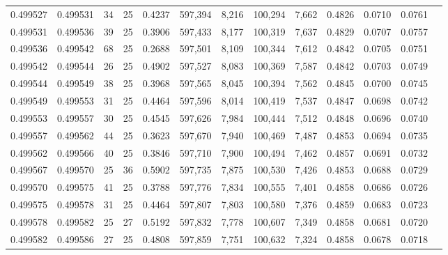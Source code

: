\begin{tabular}{rrrrrrrrrrrrr}
0.499527 & 0.499531 &    34 &  25 &                                     0.4237 & 597,394 &   8,216 & 100,294 &   7,662 & 0.4826 & 0.0710 & 0.0761 \\
0.499531 & 0.499536 &    39 &  25 &                                     0.3906 & 597,433 &   8,177 & 100,319 &   7,637 & 0.4829 & 0.0707 & 0.0757 \\
0.499536 & 0.499542 &    68 &  25 &                                     0.2688 & 597,501 &   8,109 & 100,344 &   7,612 & 0.4842 & 0.0705 & 0.0751 \\
0.499542 & 0.499544 &    26 &  25 &                                     0.4902 & 597,527 &   8,083 & 100,369 &   7,587 & 0.4842 & 0.0703 & 0.0749 \\
0.499544 & 0.499549 &    38 &  25 &                                     0.3968 & 597,565 &   8,045 & 100,394 &   7,562 & 0.4845 & 0.0700 & 0.0745 \\
0.499549 & 0.499553 &    31 &  25 &                                     0.4464 & 597,596 &   8,014 & 100,419 &   7,537 & 0.4847 & 0.0698 & 0.0742 \\
0.499553 & 0.499557 &    30 &  25 &                                     0.4545 & 597,626 &   7,984 & 100,444 &   7,512 & 0.4848 & 0.0696 & 0.0740 \\
0.499557 & 0.499562 &    44 &  25 &                                     0.3623 & 597,670 &   7,940 & 100,469 &   7,487 & 0.4853 & 0.0694 & 0.0735 \\
0.499562 & 0.499566 &    40 &  25 &                                     0.3846 & 597,710 &   7,900 & 100,494 &   7,462 & 0.4857 & 0.0691 & 0.0732 \\
0.499567 & 0.499570 &    25 &  36 &                                     0.5902 & 597,735 &   7,875 & 100,530 &   7,426 & 0.4853 & 0.0688 & 0.0729 \\
0.499570 & 0.499575 &    41 &  25 &                                     0.3788 & 597,776 &   7,834 & 100,555 &   7,401 & 0.4858 & 0.0686 & 0.0726 \\
0.499575 & 0.499578 &    31 &  25 &                                     0.4464 & 597,807 &   7,803 & 100,580 &   7,376 & 0.4859 & 0.0683 & 0.0723 \\
0.499578 & 0.499582 &    25 &  27 &                                     0.5192 & 597,832 &   7,778 & 100,607 &   7,349 & 0.4858 & 0.0681 & 0.0720 \\
0.499582 & 0.499586 &    27 &  25 &                                     0.4808 & 597,859 &   7,751 & 100,632 &   7,324 & 0.4858 & 0.0678 & 0.0718 \\

\end{tabular}
